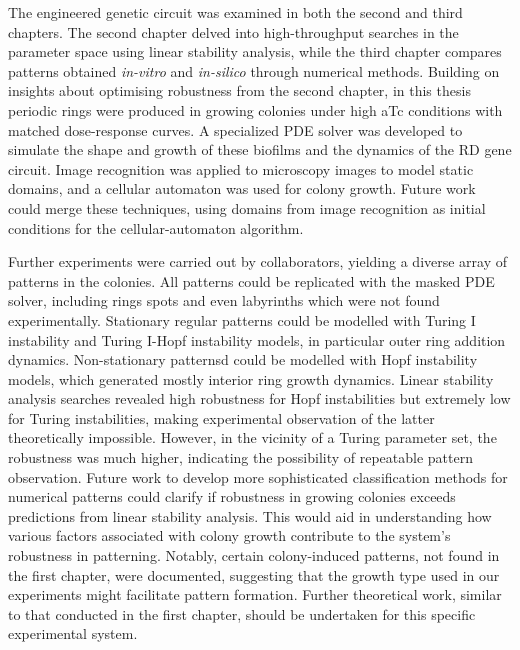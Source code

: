 The engineered genetic circuit was examined in both the second and third chapters.
The second chapter delved into high-throughput searches in the parameter space using linear stability analysis, while the third chapter compares patterns obtained \textit{in-vitro} and \textit{in-silico} through numerical methods.
Building on insights about optimising robustness from the second chapter, in this thesis periodic rings were produced in growing colonies under high aTc conditions with matched dose-response curves.
A specialized PDE solver was developed to simulate the shape and growth of these biofilms and the dynamics of the RD gene circuit.
Image recognition was applied to microscopy images to model static domains, and a cellular automaton was used for colony growth.
Future work could merge these techniques, using domains from image recognition as initial conditions for the cellular-automaton algorithm.

Further experiments were carried out by collaborators, yielding a diverse array of patterns in the colonies.
All patterns could be replicated with the masked PDE solver, including rings spots and even labyrinths which were not found experimentally.
Stationary regular patterns could be modelled with Turing I instability and Turing I-Hopf instability models, in particular outer ring addition dynamics.
Non-stationary patternsd could be modelled with Hopf instability models, which generated mostly interior ring growth dynamics.
Linear stability analysis searches revealed high robustness for Hopf instabilities but extremely low for Turing instabilities, making experimental observation of the latter theoretically impossible.
However, in the vicinity of a Turing parameter set, the robustness was much higher, indicating the possibility of repeatable pattern observation.
Future work to develop more sophisticated classification methods for numerical patterns could clarify if robustness in growing colonies exceeds predictions from linear stability analysis.
This would aid in understanding how various factors associated with colony growth contribute to the system's robustness in patterning.
Notably, certain colony-induced patterns, not found in the first chapter, were documented, suggesting that the growth type used in our experiments might facilitate pattern formation.
Further theoretical work, similar to that conducted in the first chapter, should be undertaken for this specific experimental system.


